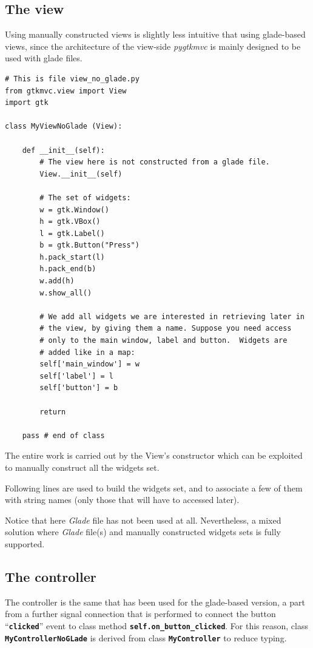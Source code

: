 \documentclass{article}
\newcommand{\kw}[1]{\emph{#1}\xspace}
\newcommand{\appl}[1]{\textsl{#1}\xspace}
\newcommand{\glade}{\appl{Glade}}
\newcommand{\pygtkmvc}{\kw{pygtkmvc}}
\newcommand{\codename}[1]{\texttt{\bfseries \textcolor {codecolor}{#1}}\xspace}
\newcommand{\codesize}{\small } %
\begin{document}
\subsection{The view}
Using manually constructed views is slightly less intuitive that using
glade-based views, since the architecture of the view-side \pygtkmvc
is mainly designed to be used with glade files.

{ \codesize 
\begin{verbatim}   
# This is file view_no_glade.py
from gtkmvc.view import View
import gtk

class MyViewNoGlade (View):

    def __init__(self):
        # The view here is not constructed from a glade file.
        View.__init__(self)

        # The set of widgets:
        w = gtk.Window()
        h = gtk.VBox()
        l = gtk.Label()
        b = gtk.Button("Press")
        h.pack_start(l)
        h.pack_end(b)
        w.add(h)
        w.show_all()

        # We add all widgets we are interested in retrieving later in
        # the view, by giving them a name. Suppose you need access
        # only to the main window, label and button.  Widgets are
        # added like in a map:
        self['main_window'] = w
        self['label'] = l
        self['button'] = b
        
        return

    pass # end of class
\end{verbatim}
} 

The entire work is carried out by the View's constructor which can
be exploited to manually construct all the widgets set.

Following lines are used to build the widgets set, and to associate a
few of them with string names (only those that will have to accessed
later).

Notice that here \glade file has not been used at all. Nevertheless, a
mixed solution where \glade file(s) and manually constructed widgets
sets is fully supported.


\subsection{The controller}
The controller is the same that has been used for the glade-based
version, a part from a further signal connection that is performed to
connect the button ``\codename{clicked}'' event to class method
\codename{self.on\_button\_clicked}. For this reason, class
\codename{MyControllerNoGLade} is derived from class
\codename{MyController} to reduce typing.
 
\end{document}
